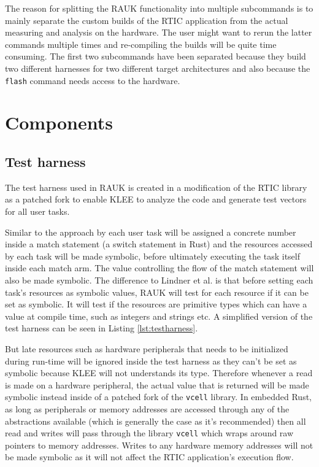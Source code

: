 The reason for splitting the RAUK functionality into multiple subcommands is to
mainly separate the custom builds of the RTIC application from the actual
measuring and analysis on the hardware. The user might want to rerun the latter
commands multiple times and re-compiling the builds will be quite time
consuming. The first two subcommands have been separated because they build
two different harnesses for two different target architectures and also because
the \texttt{flash} command needs access to the hardware.

\section{Components}

\subsection{Test harness}
The test harness used in RAUK is created in a modification of the RTIC library
as a patched fork to enable KLEE to analyze the code and generate test
vectors for all user tasks.

Similar to the approach by \cite{lindner} each user task will be assigned a
concrete number inside a match statement (a switch statement in Rust) and the
resources accessed by each task will be made symbolic, before ultimately
executing the task itself inside each match arm. The value controlling the flow
of the match statement will also be made symbolic. The difference to Lindner et
al. is that before setting each task's resources as symbolic values, RAUK will
test for each resource if it can be set as symbolic. It will test if the
resources are primitive types which can have a value at compile time, such as
integers and strings etc. A simplified version of the test harness can be seen
in Listing \ref{lst:testharness}.



But late resources such as hardware peripherals that needs to be initialized
during run-time will be ignored inside the test harness as they can't be set as
symbolic because KLEE will not understands its type. Therefore whenever a read
is made on a hardware peripheral, the actual value that is returned will be
made symbolic instead inside of a patched fork of the \texttt{vcell} library.
In embedded Rust, as long as peripherals or memory addresses are accessed
through any of the abstractions available (which is generally the case as it's
recommended) then all read and writes will pass through the library
\texttt{vcell} which wraps around raw pointers to memory addresses. Writes to
any hardware memory addresses will not be made symbolic as it will not affect
the RTIC application's execution flow.

